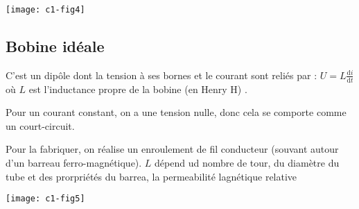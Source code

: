 \documentclass[french]{yLectureNote}
\begin{document}
\texttt{[image: c1-fig4]}
\subsection{Bobine idéale}
C'est un dip\^ole dont la tension à ses bornes et le courant sont reliés par : \(U = L \frac{\mathrm{d}i}{\mathrm{d}t}\) où $L$ est l'inductance propre de la bobine (en Henry H) .

Pour un courant constant, on a une tension nulle, donc cela se comporte comme un court-circuit.

Pour la fabriquer, on réalise un enroulement de fil conducteur (souvant autour d'un barreau ferro-magnétique). \(L\) dépend ud nombre de tour, du diamètre du tube et des prorpriétés du barrea, la permeabilité lagnétique relative

\texttt{[image: c1-fig5]}
\end{document}
